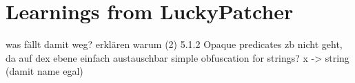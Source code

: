\section{Learnings from LuckyPatcher}\label{section:luckypatcher-learnings}
was fällt damit weg?\newline
erklären warum 	(2) 5.1.2 Opaque predicates zb nicht geht, da auf dex ebene einfach austauschbar\newline
simple obfuscation for strings? x -> string (damit name egal)
